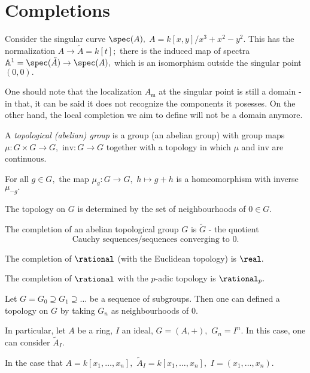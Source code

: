 \section{Completions}
Consider the singular curve \(\spec(A),\) \(A = k[x,y]/{x^3+x^2-y^2}.\) This has the normalization \(A \to \tilde{A} = k[t];\) there is the induced map of spectra
\(\mathbb{A}^1 = \spec(\tilde{A}) \to \spec(A),\) which is an isomorphism outside the singular point \((0, 0).\)

One should note that the localization \(A_{\mathfrak{m}}\) at the singular point is still a domain - in that, it can be said it does not recognize the components it posesses. On the other hand, the local completion we aim to define will not be a domain anymore.

\begin{df}
  A \emph{topological (abelian) group} is a group (an abelian group) with group maps \(\mu \colon G \times G \to G,\) \(\mathrm{inv} \colon G \to G\) together with a topology in which \(\mu\) and \(\mathrm{inv}\) are continuous.
\end{df}

\begin{note}
  For all \(g \in G,\) the map \(\mu_g \colon G \to G,\) \(h \mapsto g + h\) is a homeomorphism with inverse \(\mu_{-g}.\)
\end{note}

\begin{corollary}
  The topology on \(G\) is determined by the set of neighbourhoods of \(0 \in G.\)
\end{corollary}

\begin{df}
  The completion of an abelian topological group \(G\) is \(\tilde{G}\) - the quotient
  \[\text{Cauchy sequences}/{\text{sequences converging to 0}}.\]
\end{df}

\begin{example}
  The completion of \(\rational\) (with the Euclidean topology) is \(\real.\)
\end{example}

\begin{example}
  The completion of \(\rational\) with the \(p\)-adic topology is \(\rational_p.\)
\end{example}

\begin{example}
  Let \(G = G_0 \supseteq G_1 \supseteq \dotso\) be a sequence of subgroups. Then one can defined a topology on \(G\) by taking \(G_n\) as neighbourhoods of \(0.\)

  In particular, let \(A\) be a ring, \(I\) an ideal, \(G = (A, +),\) \(G_n = I^n.\) In this case, one can consider \(\tilde{A}_I.\)

  In the case that \(A = k[x_1, \dotsc, x_n],\) \(\tilde{A}_I = k[x_1, \dotsc, x_n],\) \(I = (x_1, \dotsc, x_n).\)
\end{example}

